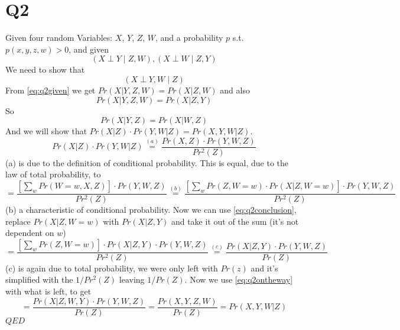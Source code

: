 \documentclass[11pt]{article}
\begin{document}
	\part*{Q2}
	Given four random Variables: $X$, $Y$, $Z$, $W$, and a probability $p$ s.t. $p(x,y,z,w)>0$, and given
\begin{equation}\label{eq:q2given}
\left(X \perp Y \mid Z, W\right), \left(X \perp W \mid Z, Y\right)
\end{equation}
We need to show that 
\begin{equation}
\left(X \perp Y,W \mid Z\right)
\end{equation}
From \eqref{eq:q2given} we get $Pr(X|Y, Z, W) = Pr(X | Z, W)$ and also
\begin{equation}\label{eq:q2ontheway}
Pr(X|Y,Z,W)=Pr(X|Z,Y)
\end{equation}
So 
\begin{equation}\label{eq:q2conclusion}
Pr(X|Y,Z)=Pr(X|W,Z)
\end{equation}
And we will show that $Pr(X|Z)\cdot Pr(Y,W|Z)=Pr(X,Y,W|Z)$.
\begin{equation*}
Pr(X|Z)\cdot Pr(Y,W|Z) \overset{(a)}{=} \frac{Pr(X,Z)\cdot Pr(Y,W,Z)}{Pr^2(Z)}
\end{equation*}
(a) is due to the definition of conditional probability. This is equal, due to the law of total probability, to
\begin{equation*}
= \frac{\left[\sum_{w}Pr(W=w,X,Z)\right] \cdot Pr(Y,W,Z)}{Pr^2(Z)}
\overset{(b)}{=} \frac{\left[\sum_{w}Pr(Z, W=w)\cdot Pr(X|Z, W=w)\right] \cdot Pr(Y,W,Z)}{Pr^2(Z)}
\end{equation*}
(b) a characteristic of conditional probability. Now we can use \eqref{eq:q2conclusion}, replace $Pr(X|Z, W=w)$ with $Pr(X|Z, Y)$ and take it out of the sum (it's not dependent on $w$)
\begin{equation*}
= \frac{\left[\sum_{w}Pr(Z, W=w)\right]\cdot Pr(X|Z, Y) \cdot Pr(Y,W,Z)}{Pr^2(Z)} \overset{(c)}{=} \frac{Pr(X|Z, Y) \cdot Pr(Y,W,Z)}{Pr(Z)} 
\end{equation*}
(c) is again due to total probability, we were only left with $Pr(z)$ and it's simplified with the $1/Pr^2(Z)$ leaving $1/Pr(Z)$.
Now we use \eqref{eq:q2ontheway} with what is left, to get 
\begin{equation*}
= \frac{Pr(X|Z, W, Y) \cdot Pr(Y,W,Z)}{Pr(Z)} = \frac{Pr(X,Y,Z,W)}{Pr(Z)} = Pr(X,Y,W|Z)
\end{equation*}
$QED$
\end{document}
